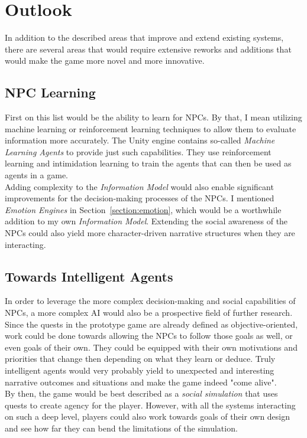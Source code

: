 \section{Outlook}
In addition to the described areas that improve and extend existing systems, there are several areas that would require extensive reworks and additions that would make the game more novel and more innovative.
\subsection{NPC Learning}
First on this list would be the ability to learn for NPCs. By that, I mean utilizing machine learning or reinforcement learning techniques to allow them to evaluate information more accurately. The Unity engine contains so-called \textit{Machine Learning Agents} to provide just such capabilities. They use reinforcement learning and intimidation learning to train the agents that can then be used as agents in a game.\\
Adding complexity to the \textit{Information Model} would also enable significant improvements for the decision-making processes of the NPCs. I mentioned \textit{Emotion Engines} in Section~\ref{section:emotion}, which would be a worthwhile addition to my own \textit{Information Model}. Extending the social awareness of the NPCs could also yield more character-driven narrative structures when they are interacting.
\subsection{Towards Intelligent Agents}
In order to leverage the more complex decision-making and social capabilities of NPCs, a more complex AI would also be a prospective field of further research. Since the quests in the prototype game are already defined as objective-oriented, work could be done towards allowing the NPCs to follow those goals as well, or even goals of their own. They could be equipped with their own motivations and priorities that change then depending on what they learn or deduce. Truly intelligent agents would very probably yield to unexpected and interesting narrative outcomes and situations and make the game indeed "come alive".\\
By then, the game would be best described as a \textit{social simulation} that uses quests to create agency for the player. However, with all the systems interacting on such a deep level, players could also work towards goals of their own design and see how far they can bend the limitations of the simulation.
